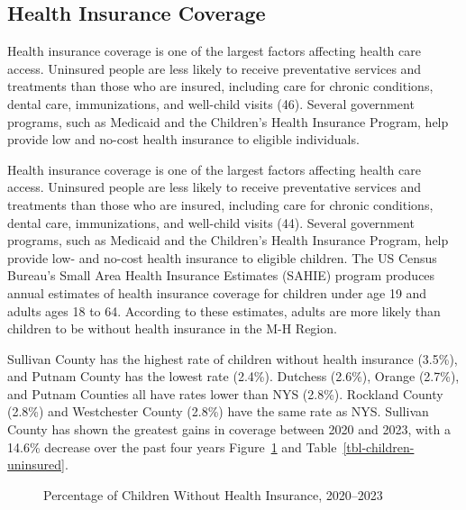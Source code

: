 \documentclass[
  english,
  letterpaper,
]{report}
\begin{document}
\subsection{Health Insurance Coverage}\label{health-insurance-coverage}

Health insurance coverage is one of the largest factors affecting health
care access. Uninsured people are less likely to receive preventative
services and treatments than those who are insured, including care for
chronic conditions, dental care, immunizations, and well-child visits
(46). Several government programs, such as Medicaid and the Children's
Health Insurance Program, help provide low and no-cost health insurance
to eligible individuals.

Health insurance coverage is one of the largest factors affecting health
care access. Uninsured people are less likely to receive preventative
services and treatments than those who are insured, including care for
chronic conditions, dental care, immunizations, and well-child visits
(44). Several government programs, such as Medicaid and the Children's
Health Insurance Program, help provide low- and no-cost health insurance
to eligible children. The US Census Bureau's Small Area Health Insurance
Estimates (SAHIE) program produces annual estimates of health insurance
coverage for children under age 19 and adults ages 18 to 64. According
to these estimates, adults are more likely than children to be without
health insurance in the M-H Region.

Sullivan County has the highest rate of children without health
insurance (3.5\%), and Putnam County has the lowest rate (2.4\%).
Dutchess (2.6\%), Orange (2.7\%), and Putnam Counties all have rates
lower than NYS (2.8\%). Rockland County (2.8\%) and Westchester County
(2.8\%) have the same rate as NYS. Sullivan County has shown the
greatest gains in coverage between 2020 and 2023, with a 14.6\% decrease
over the past four years Figure~\ref{fig-children-uninsured} and
Table~\ref{tbl-children-uninsured}.

\begin{figure}


\caption{\label{fig-children-uninsured}Percentage of Children Without
Health Insurance, 2020--2023}

\end{figure}%
\end{document}
